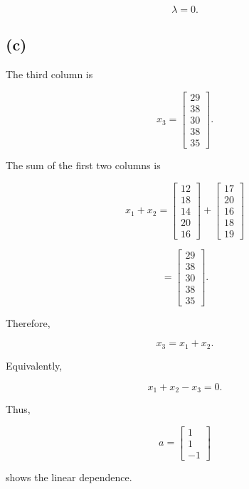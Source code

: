 \documentclass{article}
\begin{document}
$$
\boxed{\lambda=0}.
$$


\subsection*{(c)}

The third column is

$$
x_3=
\begin{bmatrix}
29\\
38\\
30\\
38\\
35
\end{bmatrix}.
$$

The sum of the first two columns is

$$
x_1+x_2
=
\begin{bmatrix}
12\\
18\\
14\\
20\\
16
\end{bmatrix}
+
\begin{bmatrix}
17\\
20\\
16\\
18\\
19
\end{bmatrix}
$$

$$
=
\begin{bmatrix}
29\\
38\\
30\\
38\\
35
\end{bmatrix}.
$$

Therefore,

$$
\boxed{x_3=x_1+x_2}.
$$

Equivalently,

$$
x_1+x_2-x_3=0.
$$

Thus,

$$
\boxed{
a=
\begin{bmatrix}
1\\
1\\
-1
\end{bmatrix}}
$$

shows the linear dependence.

\end{document}
